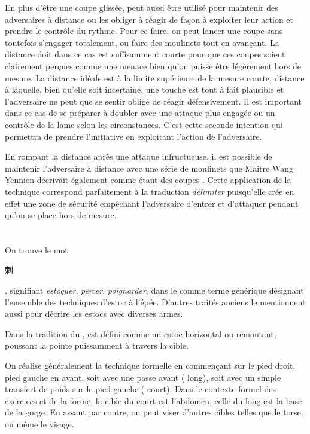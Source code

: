 En plus d'être une coupe glissée, \Hua{} peut aussi être utilisé pour maintenir des adversaires à distance ou les obliger à réagir de façon à exploiter leur action et prendre le contrôle du rythme. Pour ce faire, on peut lancer une coupe \Hua{} sans toutefois s'engager totalement, ou faire des moulinets tout en avançant. La distance doit dans ce cas est suffisamment courte pour que ces coupes soient clairement perçues comme une menace bien qu'on puisse être légèrement hors de mesure. La distance idéale est à la limite supérieure de la mesure courte, distance à laquelle, bien qu'elle soit incertaine, une touche est tout à fait plausible et l'adversaire ne peut que se sentir obligé de réagir défensivement. Il est important dans ce cas de se préparer à doubler avec une attaque plus engagée ou un contrôle de la lame selon les circonstances. C'est cette seconde intention qui permettra de prendre l'initiative en exploitant l'action de l'adversaire.

En rompant la distance après une attaque infructueuse, il est possible de maintenir l'adversaire à distance avec une série de moulinets que Maître Wang Yennien décrivait également comme étant des coupes \Hua{}. Cette application de la technique correspond parfaitement à la traduction \textit{délimiter} puisqu'elle crée en effet une zone de sécurité empêchant l'adversaire d'entrer et d'attaquer pendant qu'on se place hors de mesure.


\section{\Ci{}}
On trouve le mot \Ci{} \begin{CJK*}{UTF8}{bsmi}刺\end{CJK*}, signifiant \textit{estoquer}, \textit{percer}, \textit{poignarder}, dans le \WubeiZhi{} comme terme générique désignant l'ensemble des techniques d'estoc à l'épée. D'autres traités anciens le mentionnent aussi pour décrire les estocs avec diverses armes. 

Dans la tradition du \Yangjia{} \Michuan{}, \Ci{} est défini comme un estoc horizontal ou remontant, poussant la pointe puissamment à travers la cible. 

On réalise généralement la technique formelle en commençant sur le pied droit, pied gauche en avant, soit avec une passe avant (\Ci{} long), soit avec un simple transfert de poids sur le pied gauche (\Ci{} court). Dans le contexte formel des exercices et de la forme, la cible du \Ci{} court est l'abdomen, celle du long est la base de la gorge. En assaut par contre, on peut viser d'autres cibles telles que le torse, ou même le visage.

